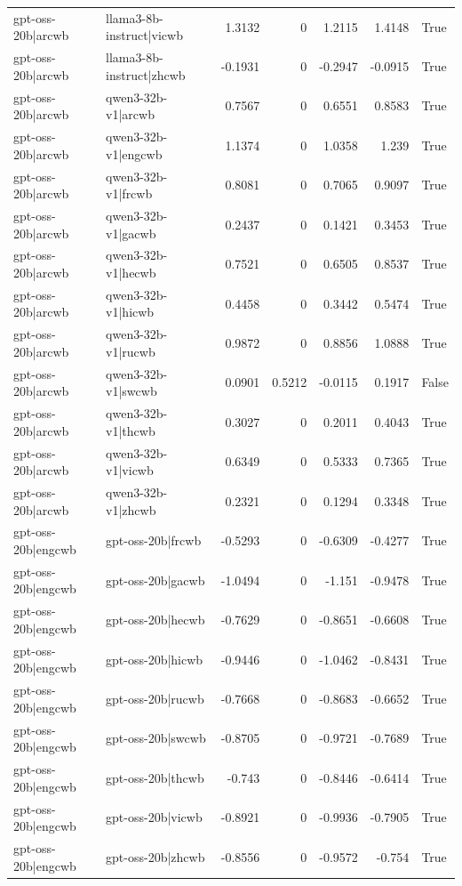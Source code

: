 \begin{table}
\begin{tabular}{l l r r r r l}
gpt-oss-20b|arcwb & llama3-8b-instruct|vicwb & 1.3132 & 0 & 1.2115 & 1.4148 & True \\
gpt-oss-20b|arcwb & llama3-8b-instruct|zhcwb & -0.1931 & 0 & -0.2947 & -0.0915 & True \\
gpt-oss-20b|arcwb & qwen3-32b-v1|arcwb & 0.7567 & 0 & 0.6551 & 0.8583 & True \\
gpt-oss-20b|arcwb & qwen3-32b-v1|engcwb & 1.1374 & 0 & 1.0358 & 1.239 & True \\
gpt-oss-20b|arcwb & qwen3-32b-v1|frcwb & 0.8081 & 0 & 0.7065 & 0.9097 & True \\
gpt-oss-20b|arcwb & qwen3-32b-v1|gacwb & 0.2437 & 0 & 0.1421 & 0.3453 & True \\
gpt-oss-20b|arcwb & qwen3-32b-v1|hecwb & 0.7521 & 0 & 0.6505 & 0.8537 & True \\
gpt-oss-20b|arcwb & qwen3-32b-v1|hicwb & 0.4458 & 0 & 0.3442 & 0.5474 & True \\
gpt-oss-20b|arcwb & qwen3-32b-v1|rucwb & 0.9872 & 0 & 0.8856 & 1.0888 & True \\
gpt-oss-20b|arcwb & qwen3-32b-v1|swcwb & 0.0901 & 0.5212 & -0.0115 & 0.1917 & False \\
gpt-oss-20b|arcwb & qwen3-32b-v1|thcwb & 0.3027 & 0 & 0.2011 & 0.4043 & True \\
gpt-oss-20b|arcwb & qwen3-32b-v1|vicwb & 0.6349 & 0 & 0.5333 & 0.7365 & True \\
gpt-oss-20b|arcwb & qwen3-32b-v1|zhcwb & 0.2321 & 0 & 0.1294 & 0.3348 & True \\
gpt-oss-20b|engcwb & gpt-oss-20b|frcwb & -0.5293 & 0 & -0.6309 & -0.4277 & True \\
gpt-oss-20b|engcwb & gpt-oss-20b|gacwb & -1.0494 & 0 & -1.151 & -0.9478 & True \\
gpt-oss-20b|engcwb & gpt-oss-20b|hecwb & -0.7629 & 0 & -0.8651 & -0.6608 & True \\
gpt-oss-20b|engcwb & gpt-oss-20b|hicwb & -0.9446 & 0 & -1.0462 & -0.8431 & True \\
gpt-oss-20b|engcwb & gpt-oss-20b|rucwb & -0.7668 & 0 & -0.8683 & -0.6652 & True \\
gpt-oss-20b|engcwb & gpt-oss-20b|swcwb & -0.8705 & 0 & -0.9721 & -0.7689 & True \\
gpt-oss-20b|engcwb & gpt-oss-20b|thcwb & -0.743 & 0 & -0.8446 & -0.6414 & True \\
gpt-oss-20b|engcwb & gpt-oss-20b|vicwb & -0.8921 & 0 & -0.9936 & -0.7905 & True \\
gpt-oss-20b|engcwb & gpt-oss-20b|zhcwb & -0.8556 & 0 & -0.9572 & -0.754 & True \\

\end{tabular}
\end{table}
